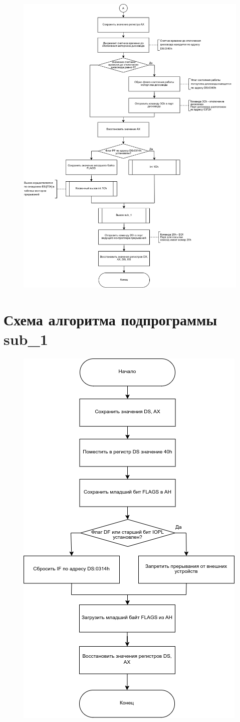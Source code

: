 \documentclass[a4paper, 12pt]{extreport}
\begin{document}
	\begin{figure}[H]
		\centering
		\includegraphics[width=\linewidth]{Int_8h_part2.png}
	\end{figure}
	\section{Схема алгоритма подпрограммы sub\_1}
	\begin{figure}[H]
		\centering
		\includegraphics[width=0.7\linewidth]{subroutine.png}
	\end{figure}
\end{document}
